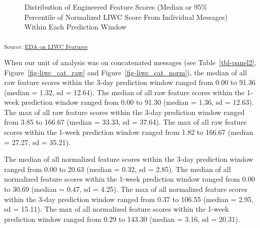 \documentclass[
  letterpaper,
  DIV=11,
  numbers=noendperiod]{scrartcl}
\begin{document}
\begin{figure}[H]


\caption{\label{fig-liwc_ind}Distribution of Engineered Feature Scores
(Median or 95\% Percentile of Normalized LIWC Score From Individual
Messages) Within Each Prediction Window}

\end{figure}%

\textsubscript{Source:
\href{https://jjcurtin.github.io/study_messages/notebooks/fig_eda_liwc-preview.html\#cell-fig-liwc_ind}{EDA
on LIWC Features}}

When our unit of analysis was on concatenated messages (see
Table~\ref{tbl-panel2}, Figure~\ref{fig-liwc_cat_raw} and
Figure~\ref{fig-liwc_cat_norm}), the median of all raw feature scores
within the 3-day prediction window ranged from 0.00 to 91.36 (median =
1.32, sd = 12.64). The median of all raw feature scores within the
1-week prediction window ranged from 0.00 to 91.30 (median = 1.36, sd =
12.63). The max of all raw feature scores within the 3-day prediction
window ranged from 3.85 to 166.67 (median = 33.33, sd = 37.64). The max
of all raw feature scores within the 1-week prediction window ranged
from 1.82 to 166.67 (median = 27.27, sd = 35.21).

The median of all normalized feature scores within the 3-day prediction
window ranged from 0.00 to 20.63 (median = 0.32, sd = 2.85). The median
of all normalized feature scores within the 1-week prediction window
ranged from 0.00 to 30.69 (median = 0.47, sd = 4.25). The max of all
normalized feature scores within the 3-day prediction window ranged from
0.37 to 106.55 (median = 2.95, sd = 15.11). The max of all normalized
feature scores within the 1-week prediction window ranged from 0.29 to
143.30 (median = 3.16, sd = 20.31).
\end{document}
